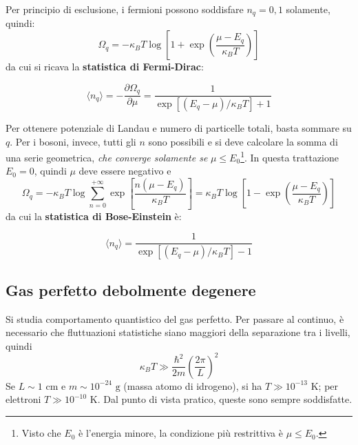 \documentclass[10pt, a4paper]{scrartcl}
\numberwithin{equation}{subsection}
\theoremstyle{style1}
\theoremstyle{style2}
\newenvironment{boxenv}[1][]{
    \begin{eqbox}[#1]
    }{
   \end{eqbox}
}
\begin{document}
Per principio di esclusione, i fermioni possono soddisfare $n_q = 0,1$ solamente, quindi:
\begin{equation}\label{ofd}
	\Omega _q = -\kappa _B T \log \left[ 1+ \exp\left(\frac{\mu  - E_q}{\kappa _B T}\right)  \right] 
\end{equation}
da cui si ricava la \textbf{statistica di Fermi-Dirac}:
\begin{boxenv}[]
\begin{equation}
	\langle n_q \rangle = - \frac{\partial \Omega _q}{\partial \mu } = \frac{1}{\exp \left[ (E_q - \mu ) / \kappa_B T \right]  + 1}
\end{equation}
\end{boxenv}
\noindent Per ottenere potenziale di Landau e numero di particelle totali, basta sommare su $q$. Per i bosoni, invece, tutti gli $n$ sono possibili e si deve calcolare la somma di una serie geometrica, \textit{che converge solamente se} $\mu \le  E_0$\footnote{Visto che $E_0$ \`e l'energia minore, la condizione pi\`u restrittiva \`e $\mu \le E_0$.}. In questa trattazione $E_0=0$, quindi $\mu $ deve essere negativo e
\begin{equation}\label{obe}
	\Omega _q = - \kappa _B T \log \sum_{n=0}^{+\infty} \exp \left[ \frac{n(\mu  - E_q)}{\kappa _B T} \right] = \kappa _B T \log \left[1 - \exp\left(\frac{\mu  - E_q}{\kappa _B T}\right) \right]
\end{equation}
da cui la \textbf{statistica di Bose-Einstein} \`e:
\begin{boxenv}[]
\begin{equation}
	\langle n_q \rangle = \frac{1}{\exp\left[ (E_q - \mu )/\kappa _B T \right] - 1}
\end{equation}
\end{boxenv}
\subsection{Gas perfetto debolmente degenere}
Si studia comportamento quantistico del gas perfetto. Per passare al continuo, \`e necessario che fluttuazioni statistiche siano maggiori della separazione tra i livelli, quindi
\begin{equation}
	\kappa _B T \gg \frac{\hbar ^2}{2m} \left(\frac{2\pi}{L}\right) ^2
\end{equation}
Se $L\sim 1 \text{ cm}$ e $m\sim 10^{-24} \text{ g}$ (massa atomo di idrogeno), si ha $T \gg 10^{-13} $ K; per elettroni $T\gg 10^{-10} $ K. Dal punto di vista pratico, queste sono sempre soddisfatte.
\end{document}
